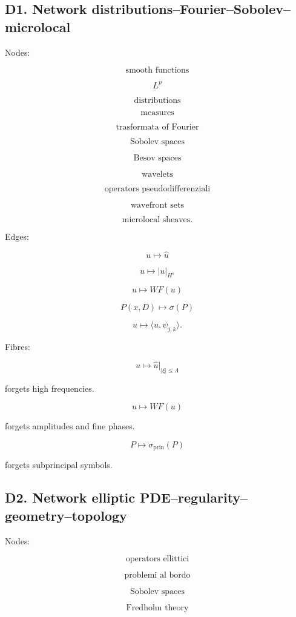 \documentclass[11pt]{article}
\begin{document}
\subsection{D1. Network distributions--Fourier--Sobolev--microlocal}

Nodes:

\[
\text{smooth functions}
\]

\[
L^p
\]

\[
\text{distributions}
\]

\[
\text{measures}
\]

\[
\text{trasformata of Fourier}
\]

\[
\text{Sobolev spaces}
\]

\[
\text{Besov spaces}
\]

\[
\text{wavelets}
\]

\[
\text{operators pseudodifferenziali}
\]

\[
\text{wavefront sets}
\]

\[
\text{microlocal sheaves}.
\]

Edges:

\[
u\mapsto \widehat u
\]

\[
u\mapsto |u|_{H^s}
\]

\[
u\mapsto WF(u)
\]

\[
P(x,D)\mapsto \sigma(P)
\]

\[
u\mapsto {\langle u,\psi_{j,k}\rangle}.
\]

Fibres:

\[
u\mapsto \widehat u|_{|\xi|\le \Lambda}
\]

forgets high frequencies.

\[
u\mapsto WF(u)
\]

forgets amplitudes and fine phases.

\[
P\mapsto \sigma_{\mathrm{prin}}(P)
\]

forgets subprincipal symbols.



\subsection{D2. Network elliptic PDE--regularity--geometry--topology}

Nodes:

\[
\text{operators ellittici}
\]

\[
\text{problemi al bordo}
\]

\[
\text{Sobolev spaces}
\]

\[
\text{Fredholm theory}
\]
\end{document}

